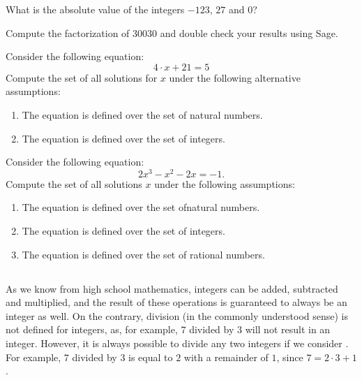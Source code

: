 \begin{exercise}
What is the absolute value of the integers $-123$, $27$ and $0$?
\end{exercise}
\begin{exercise}
Compute the factorization of $30030$ and double check your results using  Sage.
\end{exercise}
\begin{exercise}
Consider the following equation:
\begin{equation*}4\cdot x + 21 = 5\end{equation*}
Compute the set of all solutions for $x$ under the following alternative assumptions:
\begin{enumerate}
\item The equation is defined over the set of natural numbers.
\item The equation is defined over the set of integers.
\end{enumerate}
\end{exercise}
\begin{exercise}
Consider the following equation:
\begin{equation*} 2 x^3 - x^2 - 2 x = - 1.\end{equation*}
Compute the set of all solutions $x$ under the following assumptions:
\begin{enumerate}
\item The equation is defined over the set ofnatural numbers.
\item The equation is defined over the set of integers.
\item The equation is defined over the set of rational numbers.
\end{enumerate}
\end{exercise}

\subsection{}
\label{Euclidean_division}
As we know from high school mathematics, integers can be added, subtracted and multiplied, and the result of these operations is guaranteed to always be an integer as well.
On the contrary, division (in the commonly understood sense) is not defined for integers, as, for example, $7$ divided by $3$ will not result in an integer. However, it is always possible to divide any two integers if we consider . For example, $7$ divided by $3$ is equal to $2$ with a remainder of $1$, since $7 = 2\cdot 3 + 1$.

